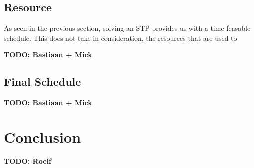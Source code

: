 \documentclass{article}
\theoremstyle{definition}
\newcommand{\TODO}[1]{{\color{red}\textbf{TODO: #1}}}
\begin{document}
\subsection{Resource}
As seen in the previous section, solving an STP provides us with a time-feasable schedule. This does not take in consideration, the resources that are used to 

\TODO{Bastiaan + Mick}

\subsection{Final Schedule}

\TODO{Bastiaan + Mick}

\newpage

\section{Conclusion}
\TODO{Roelf}



\newpage


\end{document}

